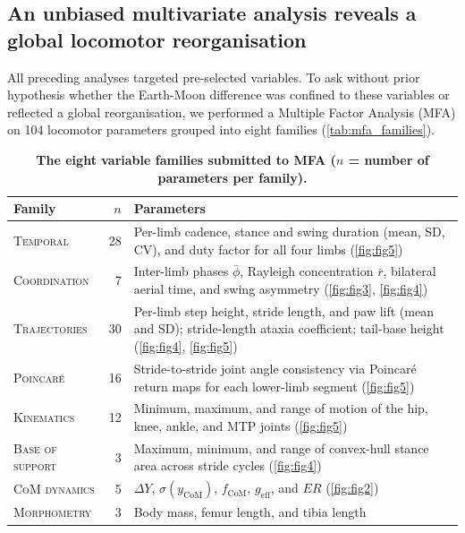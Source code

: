 \documentclass[blue]{enslyonstage}
\begin{document}
\subsection{An unbiased multivariate analysis reveals a global locomotor reorganisation}

All preceding analyses targeted pre-selected variables. To ask without prior
hypothesis whether the Earth-Moon difference was confined to these variables or
reflected a global reorganisation, we performed a Multiple Factor Analysis
(MFA\cite{escofierMultipleFactorAnalysis1994}) on 104 locomotor parameters
grouped into eight families (\autoref{tab:mfa_families}).

\begin{table}[!ht]
\footnotesize
\centering
\caption{\bf The eight variable families submitted to MFA ($n$ = number of
    parameters per family).}
\label{tab:mfa_families}
\begin{tabular}{lrp{}}
\toprule
\textbf{Family} & $n$ & \textbf{Parameters} \\
\midrule
\textsc{Temporal}        & 28 & Per-limb cadence, stance and swing duration
  (mean, SD, CV), and duty factor for all four limbs (\autoref{fig:fig5}) \\
\midrule
\textsc{Coordination}    &  7 & Inter-limb phases $\bar\phi$, Rayleigh
  concentration $\bar r$, bilateral aerial time, and swing asymmetry
  (\autoref{fig:fig3}, \autoref{fig:fig4}) \\
\midrule
\textsc{Trajectories}    & 30 & Per-limb step height, stride length, and paw
  lift (mean and SD); stride-length ataxia coefficient; tail-base height
  (\autoref{fig:fig4}, \autoref{fig:fig5}) \\
\midrule
\textsc{Poincaré}        & 16 & Stride-to-stride joint angle consistency via
  Poincaré return maps for each lower-limb segment (\autoref{fig:fig5}) \\
\midrule
\textsc{Kinematics}      & 12 & Minimum, maximum, and range of motion of the
  hip, knee, ankle, and MTP joints (\autoref{fig:fig5}) \\
\midrule
\textsc{Base of support} &  3 & Maximum, minimum, and range of convex-hull
  stance area across stride cycles (\autoref{fig:fig4}) \\
\midrule
\textsc{CoM dynamics}    &  5 & $\Delta Y$, $\sigma(y_\text{CoM})$,
  $f_\text{CoM}$, $g_\text{eff}$, and $ER$ (\autoref{fig:fig2}) \\
\midrule
\textsc{Morphometry}     &  3 & Body mass, femur length, and tibia length \\
\bottomrule
\end{tabular}
\end{table}
\end{document}
